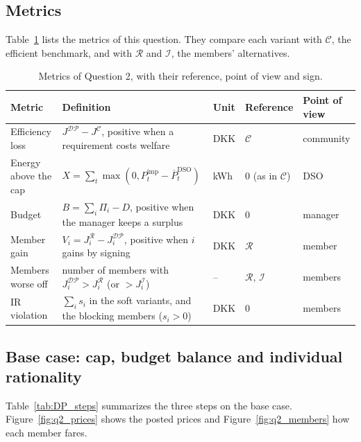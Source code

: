 \subsection{Metrics}
Table~\ref{tab:DP_metrics} lists the metrics of this question.
They compare each variant with $\mathcal{C}$, the efficient benchmark, and with $\mathcal{R}$ and $\mathcal{I}$, the members' alternatives.

\begin{table}[htbp]
\centering
\caption{Metrics of Question 2, with their reference, point of view and sign.}
\label{tab:DP_metrics}
\small
\begin{tabularx}{\textwidth}{@{}lXlll@{}}
\toprule
Metric & Definition & Unit & Reference & Point of view\\
\midrule
Efficiency loss & $J^{\mathcal{DP}}-J^{\mathcal{C}}$, positive when a requirement costs welfare & DKK & $\mathcal{C}$ & community\\
Energy above the cap & $X=\sum_t\max(0,P^{\mathrm{imp}}_t-\overline{P}^{\mathrm{DSO}}_t)$ & kWh & 0 (as in $\mathcal{C}$) & DSO\\
Budget & $B=\sum_i\Pi_i-D$, positive when the manager keeps a surplus & DKK & 0 & manager\\
Member gain & $V_i=J^{\mathcal{R}}_i-J^{\mathcal{DP}}_i$, positive when $i$ gains by signing & DKK & $\mathcal{R}$ & member\\
Members worse off & number of members with $J^{\mathcal{DP}}_i>J^{\mathcal{R}}_i$ (or $>J^{\mathcal{I}}_i$) & -- & $\mathcal{R}$, $\mathcal{I}$ & members\\
IR violation & $\sum_is_i$ in the soft variants, and the blocking members ($s_i>0$) & DKK & 0 & members\\
\bottomrule
\end{tabularx}
\end{table}

\subsection{Base case: cap, budget balance and individual rationality}\label{sec:q2_steps}
Table~\ref{tab:DP_steps} summarizes the three steps on the base case.
Figure~\ref{fig:q2_prices} shows the posted prices and Figure~\ref{fig:q2_members} how each member fares.

